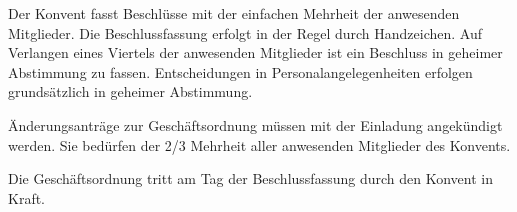 \documentclass[a4paper, parskip=half, numbers=noenddot]{scrartcl}
\begin{document}
\begin{contract}
Der Konvent fasst Beschlüsse mit der einfachen Mehrheit der anwesenden Mitglieder. Die
Beschlussfassung erfolgt in der Regel durch Handzeichen. Auf Verlangen eines Viertels der
anwesenden Mitglieder ist ein Beschluss in geheimer Abstimmung zu fassen. Entscheidungen in Personalangelegenheiten erfolgen grundsätzlich in geheimer Abstimmung.


Änderungsanträge zur Geschäftsordnung müssen mit der Einladung angekündigt werden. Sie bedürfen der 2/3 Mehrheit aller anwesenden Mitglieder des Konvents.

Die Geschäftsordnung tritt am Tag der Beschlussfassung durch den Konvent in Kraft.


\end{contract}
\end{document}
